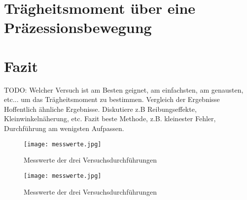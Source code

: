 \documentclass{article}
\begin{document}
	\section{Trägheitsmoment über eine Präzessionsbewegung}

	\section{Fazit}
	TODO: Welcher Versuch ist am Besten geignet, am einfachsten, am genausten, etc... um das Trägheitsmoment zu bestimmen.
	Vergleich der Ergebnisse
    Hoffentlich ähnliche Ergebnisse.
    Diskutiere z.B Reibungseffekte, Kleinwinkelnäherung, etc.
    Fazit beste Methode, z.B. kleinester Fehler, Durchführung am wenigsten Aufpassen.


	\printbibliography[title={Quellen}]

	\begin{figure}[!h]\label{fig:Messwerte1}
		\centering
		\texttt{[image: messwerte.jpg]}
		\caption{Messwerte der drei Versuchsdurchführungen}
	\end{figure}

	\begin{figure}[!h]\label{fig:Messwerte2}
		\centering
		\texttt{[image: messwerte.jpg]}
		\caption{Messwerte der drei Versuchsdurchführungen}
	\end{figure}
\end{document}
